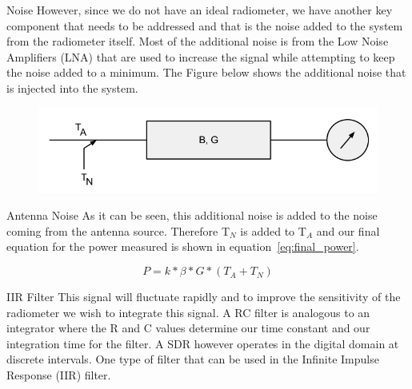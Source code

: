 \documentclass{beamer}
\begin{document}
\begin{frame}
\begin{block}{Noise}
However, since we do not have an ideal radiometer, we have another key component that needs to be addressed and that is the noise added to the system from the radiometer itself.  Most of the additional noise is from the Low Noise Amplifiers (LNA) that are used to increase the signal while attempting to keep the noise added to a minimum.  The Figure below shows the additional noise that is injected into the system.

{\begin{figure}[h!tb] 
\centering
\includegraphics[width=\textwidth]{../Images/radiometer_noise_added.png}
\label{noiserad}
\end{figure}
}
\end{block}
\end{frame}

\begin{frame}
\begin{block}{Antenna Noise}
As it can be seen, this additional noise is added to the noise coming from the antenna source.  Therefore T$_{N}$ is added to T$_{A}$ and our final equation for the power measured is shown in equation~\ref{eq:final_power}.  

\begin{equation} \label{eq:final_power}
P=k*\beta*G*(T_{A}+T_{N})
\end{equation}
\end{block}
\end{frame}

\begin{frame}
\begin{block}{IIR Filter}
This signal will fluctuate rapidly and to improve the sensitivity of the radiometer we wish to integrate this signal.  A RC filter is analogous to an integrator where the R and C values determine our time constant and our integration time for the filter.  A SDR however operates in the digital domain at discrete intervals.  One type of filter that can be used in the Infinite Impulse Response (IIR) filter. 
\end{block}
\end{frame}
\end{document}
